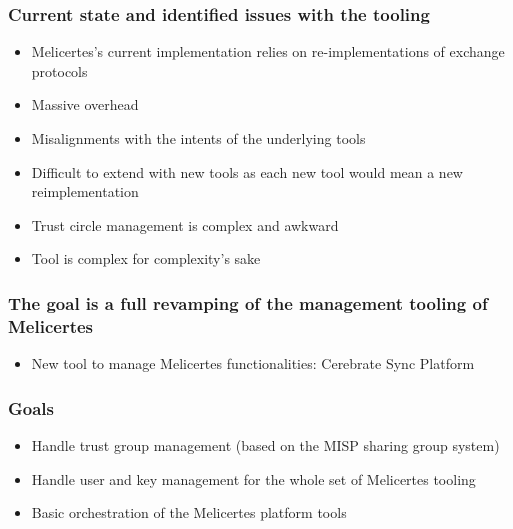 
\begin{frame}
\titlepage
\end{frame}

\begin{frame}
  \frametitle{Current state and identified issues with the tooling}
  \begin{itemize}
    \item Melicertes's current implementation relies on re-implementations of exchange protocols
    \item Massive overhead
    \item Misalignments with the intents of the underlying tools
    \item Difficult to extend with new tools as each new tool would mean a new reimplementation
    \item Trust circle management is complex and awkward
    \item Tool is complex for complexity's sake
  \end{itemize}
\end{frame}

\begin{frame}
  \frametitle{The goal is a full revamping of the management tooling of Melicertes}
  \begin{itemize}
    \item New tool to manage Melicertes functionalities: Cerebrate Sync Platform
  \end{itemize}
\end{frame}

\begin{frame}
  \frametitle{Goals}
  \begin{itemize}
    \item Handle trust group management (based on the MISP sharing group system)
    \item Handle user and key management for the whole set of Melicertes tooling
    \item Basic orchestration of the Melicertes platform tools
  \end{itemize}
\end{frame}

